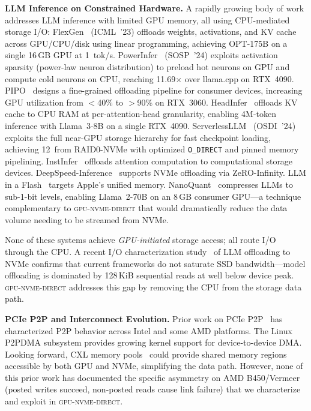 \documentclass{article}
\newcommand{\sysname}{\textsc{gpu-nvme-direct}}
\newcommand{\GBs}{\,\text{GB/s}}
\begin{document}
\textbf{LLM Inference on Constrained Hardware.}
A rapidly growing body of work addresses LLM inference with limited GPU memory,
all using CPU-mediated storage I/O:
FlexGen~\cite{sheng2023flexgen} (ICML~'23) offloads weights, activations, and
KV cache across GPU/CPU/disk using linear programming, achieving OPT-175B on a
single 16\,GB GPU at 1~tok/s.
PowerInfer~\cite{song2023powerinfer} (SOSP~'24) exploits activation sparsity
(power-law neuron distribution) to preload hot neurons on GPU and compute cold
neurons on CPU, reaching 11.69$\times$ over llama.cpp on RTX~4090.
PIPO~\cite{liu2025pipo} designs a fine-grained offloading pipeline for consumer
devices, increasing GPU utilization from $<$40\% to $>$90\% on RTX~3060.
HeadInfer~\cite{luo2025headinfer} offloads KV cache to CPU RAM at per-attention-head
granularity, enabling 4M-token inference with Llama~3-8B on a single RTX~4090.
ServerlessLLM~\cite{fu2024serverlessllm} (OSDI~'24) exploits the full
near-GPU storage hierarchy for fast checkpoint loading, achieving 12\GBs{}
from RAID0-NVMe with optimized \texttt{O\_DIRECT} and pinned memory pipelining.
InstInfer~\cite{instinfer2024} offloads attention computation to computational
storage devices. DeepSpeed-Inference~\cite{aminabadi2022deepspeed} supports
NVMe offloading via ZeRO-Infinity. LLM in a Flash~\cite{alizadeh2023llmflash}
targets Apple's unified memory. NanoQuant~\cite{chong2026nanoquant} compresses
LLMs to sub-1-bit levels, enabling Llama~2-70B on an 8\,GB consumer GPU---a
technique complementary to \sysname{} that would dramatically reduce the data
volume needing to be streamed from NVMe.

None of these systems achieve \emph{GPU-initiated} storage access; all route
I/O through the CPU. A recent I/O characterization study~\cite{cheops2025io}
of LLM offloading to NVMe confirms that current frameworks do not saturate
SSD bandwidth---model offloading is dominated by 128\,KiB sequential reads
at well below device peak. \sysname{} addresses this gap by removing the CPU
from the storage data path.

\textbf{PCIe P2P and Interconnect Evolution.}
Prior work on PCIe P2P~\cite{markussen2021smartio} has characterized P2P
behavior across Intel and some AMD platforms. The Linux P2PDMA subsystem
provides growing kernel support for device-to-device DMA. Looking forward,
CXL memory pools~\cite{zhong2025cxl} could provide shared memory regions
accessible by both GPU and NVMe, simplifying the data path. However, none
of this prior work has documented the specific asymmetry on AMD B450/Vermeer
(posted writes succeed, non-posted reads cause link failure) that we
characterize and exploit in \sysname{}.
\end{document}
